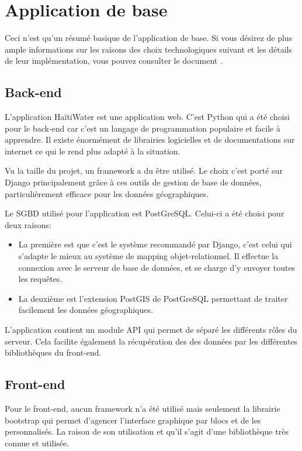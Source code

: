 \documentclass{EPL-master-thesis-covers-FR}
\begin{document}
		\section{Application de base}
			Ceci n'est qu'un résumé basique de l'application de base. Si vous désirez de plus ample informations sur les raisons des choix technologiques suivant et les détails de leur implémentation, vous pouvez consulter le document \cite{ref:haitiwater}.
			
			\subsection*{Back-end}
				L'application HaïtiWater est une application web. C'est Python qui a été choisi pour le back-end car c'est un langage de programmation populaire et facile à apprendre. Il existe énormément de librairies logicielles et de documentations sur internet ce qui le rend plus adapté à la situation.
			
				Vu la taille du projet, un framework a du être utilisé. Le choix c'est porté sur Django principalement grâce à ces outils de gestion de base de données, particulièrement efficace pour les données géographiques.	
			
				Le SGBD utilisé pour l'application est PostGreSQL. Celui-ci a été choisi pour deux raisons:
				\begin{itemize}
					\item La première est que c'est le système recommandé par Django, c'est celui qui s'adapte le mieux au système de mapping objet-relationnel. Il effectue la connexion avec le serveur de base de données, et se charge d’y envoyer
toutes les requêtes.

					\item La deuxième est l'extension PostGIS de PostGreSQL permettant de traiter facilement les données géographiques.
				\end{itemize}			
				
				L'application contient un module API qui permet de séparé les différents rôles du serveur. Cela facilite également la récupération des des données par les différentes bibliothèques du front-end.
			
						
			\subsection*{Front-end}
				Pour le front-end, aucun framework n'a été utilisé mais seulement la librairie bootstrap qui permet d'agencer l'interface graphique par blocs et de les personnalisés. La raison de son utilisation et qu'il s'agit d'une bibliothèque très connue et utilisée.
				
\end{document}
